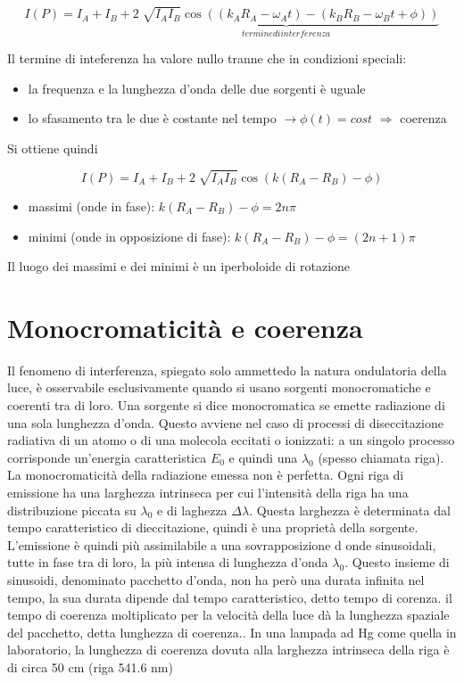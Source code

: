 \documentclass[a4paper,11pt]{report}
\begin{document}
\begin{equation*}
    I(P) = I_A + I_B + \underbrace{2\sqrt[]{I_AI_B} \cos{((k_AR_A - \omega_At)- (k_BR_B - \omega_Bt + \phi))}}_{termine di interferenza}
\end{equation*}

\noindent Il termine di inteferenza ha valore nullo tranne che in condizioni speciali:

\begin{itemize}
    \item la frequenza e la lunghezza d'onda delle due sorgenti è uguale
    \item lo sfasamento tra le due è costante nel tempo $\rightarrow \phi(t) = cost $ $\Rightarrow$ coerenza
\end{itemize}

\noindent Si ottiene quindi

\begin{equation*}
    I(P) = I_A + I_B + 2\sqrt[]{I_AI_B} \cos{(k(R_A - R_B) -\phi)}
\end{equation*}

\begin{itemize}
    \item massimi (onde in fase): $k(R_A - R_B) -\phi = 2n\pi$
    \item minimi (onde in opposizione di fase): $k(R_A - R_B) -\phi = (2n +1)\pi$
\end{itemize}

\noindent Il luogo dei massimi e dei minimi è un iperboloide di rotazione

\section{Monocromaticità e coerenza}

Il fenomeno di interferenza, spiegato solo ammettedo la natura ondulatoria della luce, è osservabile esclusivamente quando si usano sorgenti monocromatiche e coerenti tra di loro.
Una sorgente si dice monocromatica se emette radiazione di una sola lunghezza d'onda.
Questo avviene nel caso di processi di diseccitazione radiativa di un atomo o di una molecola eccitati o ionizzati: a un singolo processo corrisponde un'energia caratteristica $E_0$ e quindi una $\lambda_0$ (spesso chiamata riga).
La monocromaticità della radiazione emessa non è perfetta. 
Ogni riga di emissione ha una larghezza intrinseca per cui l'intensità della riga ha una distribuzione piccata su $\lambda_0$ e di laghezza $\Delta\lambda$.
Questa larghezza è determinata dal tempo caratteristico di dieccitazione, quindi è una proprietà della sorgente.
L'emissione è quindi più assimilabile a una sovrapposizione d onde sinusoidali, tutte in fase tra di loro, la più intensa di lunghezza d'onda $\lambda_0$. 
Questo insieme di sinusoidi, denominato pacchetto d'onda, non ha però una durata infinita nel tempo, la sua durata dipende dal tempo caratteristico, detto tempo di corenza.
il tempo di coerenza moltiplicato per la velocità della luce dà la lunghezza spaziale del pacchetto, detta lunghezza di coerenza..
In una lampada ad Hg come quella in laboratorio, la lunghezza di coerenza dovuta alla larghezza intrinseca della riga è di circa 50 cm (riga 541.6 nm)
\end{document}
